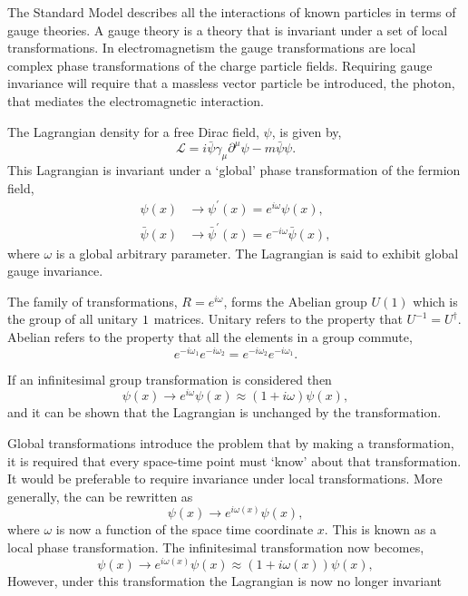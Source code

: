 The {Standard Model} describes all the interactions of known particles in terms of gauge
theories. A gauge theory is a theory that is invariant under a set of local
transformations.  In electromagnetism the gauge transformations are local
complex phase transformations of the charge particle fields. Requiring gauge
invariance will require that a massless vector particle be introduced,
the photon, that mediates the electromagnetic interaction.

The Lagrangian density for a free Dirac field, $\psi$, is given by,
\begin{equation}
\mathcal{L} = i \bar{\psi} \gamma_{\mu} \partial^{\mu} \psi - m \bar{\psi}\psi .
\end{equation}
This Lagrangian is invariant under a `global' phase transformation of the
fermion field,
\begin{align}
\psi(x)       &\to \psi^{\prime}(x) = e^{i\omega} \psi(x), \label{eq:global} \\
\bar{\psi}(x) &\to \bar{\psi}^{\prime}(x) = e^{-i\omega}\bar{\psi}(x),
\end{align}
where $\omega$ is a global arbitrary parameter. 
The Lagrangian is said to exhibit global gauge invariance. 

The family of transformations, $R = e^{i \omega}$, forms the
Abelian group $U(1)$ which is the group of all unitary $1\time1$ matrices.
Unitary refers to the property that $U^{-1} = {U}^{\dagger}$.
Abelian refers to the property that all the elements in a
group commute, 
\begin{equation}
e^{-i\omega_1} 
e^{-i\omega_2} 
=
e^{-i\omega_2} 
e^{-i\omega_1} .
\end{equation}

If an infinitesimal group transformation is considered then 
\begin{equation}
\psi(x) 
\to e^{i\omega} \psi(x)
\approx (1+i\omega)\psi(x),
\end{equation}
and it can be shown that the Lagrangian is unchanged by the
transformation\cite{halzen1984quarks}.

Global transformations introduce the problem that by making a transformation, it
is required that every space-time point must `know' about that transformation. It would be
preferable to require invariance under local transformations.
More generally, the  can be rewritten as
\begin{equation}
\psi(x) \to e^{i\omega(x)} \psi(x),
\label{eq:local}
\end{equation}
where $\omega$ is now a function of the space time coordinate $x$. This is known
as a local phase transformation. The infinitesimal transformation now becomes,
\begin{equation}
\psi(x) 
\to e^{i\omega(x)} \psi(x)
\approx (1+i\omega(x))\psi(x),
\end{equation}
However, under this transformation the Lagrangian is now no longer
invariant 

